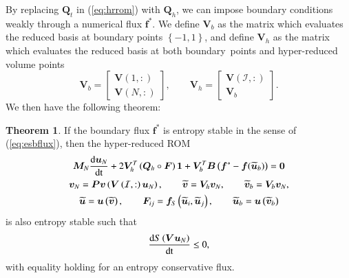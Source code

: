 \documentclass[preprint,10pt]{elsarticle}
\theoremstyle{definition}
\theoremstyle{lemma}
\theoremstyle{theorem}
\newtheorem{theorem}{Theorem}
\theoremstyle{assumption}
\renewcommand{\tilde}{\widetilde}
\newcommand{\td}[2]{\frac{{\rm d}#1}{{\rm d}{\rm #2}}}
\newcommand{\LRp}[1]{\left( #1 \right)}
\newcommand{\LRc}[1]{\left\{ #1 \right\}}
\begin{document}
By replacing $\bm{Q}_t$ in (\ref{eq:hrrom}) with $\bm{Q}_h$, we can impose boundary conditions weakly through a numerical flux $\bm{f}^*$.  We define $\bm{V}_b$ as the matrix which evaluates the reduced basis at boundary points $\LRc{-1,1}$, and define $\bm{V}_h$ as the matrix which evaluates the reduced basis at both boundary points and hyper-reduced volume points
\[
\bm{V}_{b} = \begin{bmatrix}\bm{V}(1,:) \\ \bm{V}(N,:)\end{bmatrix}, \qquad \bm{V}_h = \begin{bmatrix}
\bm{V}\LRp{\mathcal{I},:}\\
\bm{V}_{b}
\end{bmatrix}.
\]
We then have the following theorem:
\begin{theorem}
If the boundary flux $\bm{f}^*$ is entropy stable in the sense of (\ref{eq:esbflux}), then the hyper-reduced ROM 
\begin{gather}
\bm{M}_N\td{\bm{u}_N}{t} + 2\bm{V}_h^T\LRp{\bm{Q}_h \circ \bm{F}}\bm{1} + \bm{V}_{b}^T\bm{B}\LRp{\bm{f}^* - \bm{f}(\tilde{\bm{u}}_b)} = \bm{0} \label{eq:esbchr}\\
\bm{v}_N = \bm{P}\bm{v}\LRp{\bm{V}\LRp{\mathcal{I},:}\bm{u}_N}, \qquad \tilde{\bm{v}} = 
\bm{V}_h
\bm{v}_N, \qquad \tilde{\bm{v}}_b = \bm{V}_b\bm{v}_N, \nonumber\\
\tilde{\bm{u}} = \bm{u}\LRp{\tilde{\bm{v}}}, \qquad \bm{F}_{ij} = \bm{f}_S\LRp{\tilde{\bm{u}}_i,\tilde{\bm{u}}_j}, \qquad  \tilde{\bm{u}}_b = \bm{u}\LRp{\tilde{\bm{v}}_b}\nonumber
\end{gather}
is also entropy stable such that
\[
\td{S\LRp{\bm{V}\bm{u}_N}}{t} \leq 0,
\]
with equality holding for an entropy conservative flux.
\label{thm:esbchr}
\end{theorem}
\end{document}
